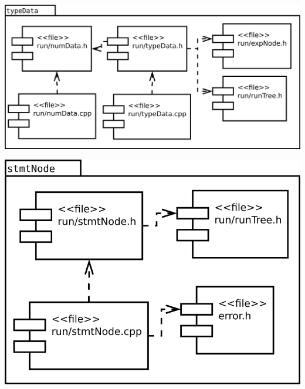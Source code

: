 \begin{multicols}{2}
\begin{center}
\includegraphics[scale=0.3]{files_arquitecture/typeData.png} \\
\end{center}
\begin{center}
\includegraphics[scale=0.3]{files_arquitecture/stmtNode.png} \\
\end{center}
\end{multicols}
\pagebreak
